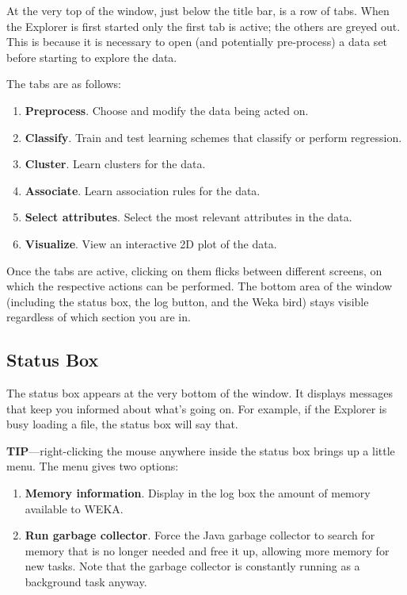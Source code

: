 \documentclass[a4paper]{article}
\begin{document}
At the very top of the window, just below the title bar, is a row of
tabs. When the Explorer is first started only the first tab is active;
the others are greyed out. This is because it is necessary to open
(and potentially pre-process) a data set before starting to explore
the data.

The tabs are as follows:

\begin{enumerate}
\item \textbf{Preprocess}.
Choose and modify the data being acted on.
\item \textbf{Classify}.
Train and test learning schemes that classify or perform regression.
\item \textbf{Cluster}.
Learn clusters for the data.
\item \textbf{Associate}.
Learn association rules for the data.
\item \textbf{Select attributes}.
Select the most relevant attributes in the data.
\item \textbf{Visualize}.
View an interactive 2D plot of the data.
\end{enumerate}
\noindent
Once the tabs are active, clicking on them flicks between different
screens, on which the respective actions can be performed.  The bottom
area of the window (including the status box, the log button, and the
Weka bird) stays visible regardless of which section you are in.

\subsection{Status Box}

The status box appears at the very bottom of the window. It displays
messages that keep you informed about what's going on. For example, if
the Explorer is busy loading a file, the status box will say that.

\textbf{TIP}---right-clicking the mouse anywhere inside the status box brings
up a little menu. The menu gives two options: 

\begin{enumerate}
\item \textbf{Memory information}.
Display in the log box the amount of memory available to WEKA.
\item \textbf{Run garbage collector}.
Force the Java garbage collector to search for memory that is no longer needed
and free it up, allowing more memory for new tasks. Note that the garbage
collector is constantly running as a background task anyway.
\end{enumerate}
\end{document}
